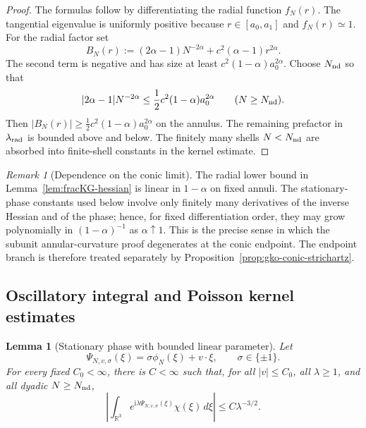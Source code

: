 \documentclass[10pt]{amsart}
\numberwithin{equation}{section}
\theoremstyle{plain}
\newtheorem{lemma}[theorem]{Lemma}
\theoremstyle{definition}
\theoremstyle{remark}
\newtheorem{remark}[theorem]{Remark}
\newcommand{\ii}{\mathrm{i}}
\begin{document}
\begin{proof}
The formulas follow by differentiating the radial function $f_N(r)$.  The tangential eigenvalue is uniformly positive because $r\in[a_0,a_1]$ and $f_N(r)\simeq1$.  For the radial factor set
\[
        B_N(r):=(2\alpha-1)N^{-2\alpha}+c^2(\alpha-1)r^{2\alpha}.
\]
The second term is negative and has size at least $c^2(1-\alpha)a_0^{2\alpha}$.  Choose $N_{\rm nd}$ so that
\[
        |2\alpha-1|N^{-2\alpha}
        \le \frac12 c^2(1-\alpha)a_0^{2\alpha}
        \qquad (N\ge N_{\rm nd}).
\]
Then $|B_N(r)|\ge\frac12c^2(1-\alpha)a_0^{2\alpha}$ on the annulus.  The remaining prefactor in $\lambda_{\rm rad}$ is bounded above and below.  The finitely many shells $N<N_{\rm nd}$ are absorbed into finite-shell constants in the kernel estimate.
\end{proof}


\begin{remark}[Dependence on the conic limit]\label{rem:hessian-alpha-dependence}
The radial lower bound in Lemma~\ref{lem:fracKG-hessian} is linear in $1-\alpha$ on fixed annuli.  The stationary-phase constants used below involve only finitely many derivatives of the inverse Hessian and of the phase; hence, for fixed differentiation order, they may grow polynomially in $(1-\alpha)^{-1}$ as $\alpha\uparrow1$.  This is the precise sense in which the subunit annular-curvature proof degenerates at the conic endpoint.  The endpoint branch is therefore treated separately by Proposition~\ref{prop:gko-conic-strichartz}.
\end{remark}


\subsection{Oscillatory integral and Poisson kernel estimates}

\begin{lemma}[Stationary phase with bounded linear parameter]\label{lem:fracKG-stationary-phase}
Let
\[
        \Psi_{N,v,\sigma}(\xi)=\sigma\phi_N(\xi)+v\cdot\xi,
        \qquad \sigma\in\{\pm1\}.
\]
For every fixed $C_0<\infty$, there is $C<\infty$ such that, for all $|v|\le C_0$, all $\lambda\ge1$, and all dyadic $N\ge N_{\rm nd}$,
\[
        \left|\int_{\mathbb R^3}e^{\ii\lambda\Psi_{N,v,\sigma}(\xi)}\chi(\xi)\,d\xi\right|
        \le C\lambda^{-3/2}.
\]
\end{lemma}
\end{document}

